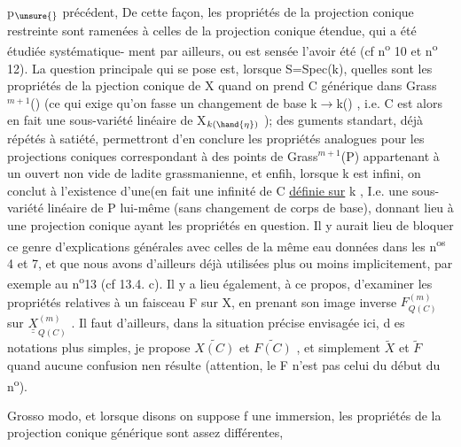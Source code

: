 
p$_{\unsure{}}$ précédent, 
 De cette façon, les propriétés de
la projection conique  restreinte  sont ramenées  à
celles de la projection conique étendue, qui a été  étudiée systématique-%
ment par ailleurs, ou est sensée l'avoir été (cf n\textsuperscript{o} 10 et n\textsuperscript{o} 12). La
question principale qui se pose est, lorsque  S=Spec(k), quelles sont
les propriétés de la pjection conique  de X  quand on prend C générique
dans Grass$^{m+1}$() (ce qui exige  qu'on fasse un changement de base
k$\rightarrow$k() , i.e.  C est alors en fait une sous-variété linéaire de X$_{k(\hand{\eta})}$ ); des
guments  standart, déjà répétés à satiété, permettront d'en conclure
les propriétés analogues pour les projections coniques correspondant à 
des points de Grass$^{m+1}$(P)  appartenant à un ouvert non vide de ladite
grassmanienne, et enfih, lorsque k est infini, on conclut à l'existence
d'une(en fait une infinité\hand{)} de  C  \uline{définie sur} k , I.e.  une sous-variété
linéaire de P lui-même (sans changement de corps de base), donnant lieu
à une projection conique ayant les propriétés en question. Il y aurait
\placedmargin{|} lieu de bloquer ce genre d'explications générales avec celles de la même
\placedmargin{|} eau données dans les n\textsuperscript{os} 4 et 7, et que nous avons d'ailleurs déjà
\placedmargin{|} utilisées plus ou moins implicitement,  par exemple au n\textsuperscript{o}13 
 (cf 13.4. c). Il y a lieu également, à ce propos, d'examiner les
propriétés relatives à un faisceau F sur X,  en prenant son image inverse
$F^{(m)}_{Q(C)}$  sur  $\underline{\underline{X}}^{(m)}_{Q(C)}$ . Il faut  d'ailleurs, dans la situation précise
envisagée ici, d es notations plus simples, je propose  $\widetilde{X(C)}$ et $\widetilde{F(C)}$ ,
et simplement $\widetilde{X}$ et $\widetilde{F}$  quand aucune confusion nen résulte  (attention, le
F   n'est pas  celui du début du n\textsuperscript{o}).

Grosso modo, et lorsque  disons on suppose  f une immersion, les
propriétés de la projection conique générique sont assez différentes,

